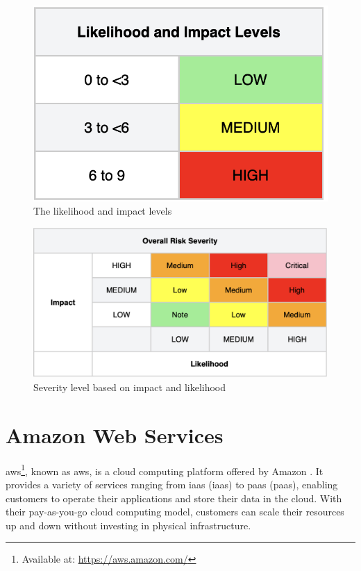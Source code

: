 \vspace{2mm}
\begin{figure}[H]
    \centering
    \includegraphics[scale=0.5]{Images/OWASP-likelihood.png}
    \caption{The likelihood and impact levels}
    \label{fig: Impact levels}
\end{figure}

\vspace{2mm}
\begin{figure}[H]
    \centering
    \includegraphics[scale=0.4]{Images/OWASP-severity.png}
    \caption{Severity level based on impact and likelihood}
    \label{fig: OWASP Severity Scale}
\end{figure}

\section{Amazon Web Services}
\acrlong{aws}\footnote{Available at: \url{https://aws.amazon.com/}}, known as \acrshort{aws}, is a cloud computing platform offered by Amazon \cite{aws}. It provides a variety of services ranging from \acrlong{iaas} (\acrshort{iaas}) to \acrlong{paas} (\acrshort{paas}), enabling customers to operate their applications and store their data in the cloud. With their pay-as-you-go cloud computing model, customers can scale their resources up and down without investing in physical infrastructure.

